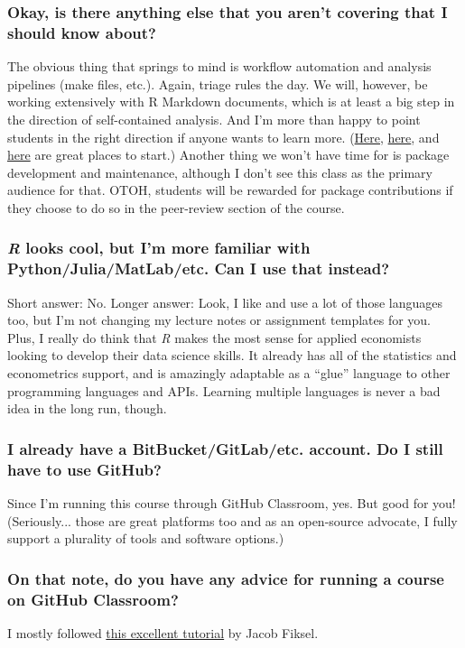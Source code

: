 \documentclass[12]{article}
\begin{document}
\vspace{-0.25cm}
\subsubsection*{Okay, is there anything else that you aren't covering that I should know about?}
The obvious thing that springs to mind is workflow automation and analysis pipelines (make files, etc.). Again, triage rules the day. We will, however, be working extensively with R Markdown documents, which is at least a big step in the direction of self-contained analysis. And I'm more than happy to point students in the right direction if anyone wants to learn more. (\href{http://stat545.com/Classroom/notes/cm109.nb.html}{Here}, \href{https://ropenscilabs.github.io/drake-manual/index.html}{here}, and \href{https://web.stanford.edu/~gentzkow/research/CodeAndData.pdf}{here} are great places to start.) Another thing we won't have time for is package development and maintenance, although I don't see this class as the primary audience for that. OTOH, students will be rewarded for package contributions if they choose to do so in the peer-review section of the course. 

\vspace{-0.25cm}
\subsubsection*{\textit{R} looks cool, but I'm more familiar with Python/Julia/MatLab/etc. Can I use that instead?}
Short answer: No. Longer answer: Look, I like and use a lot of those languages too, but I'm not changing my lecture notes or assignment templates for you. Plus, I really do think that \textit{R} makes the most sense for applied economists looking to develop their data science skills. It already has all of the statistics and econometrics support, and is amazingly adaptable as a ``glue'' language to other programming languages and APIs. Learning multiple languages is never a bad idea in the long run, though.

\vspace{-0.25cm}
\subsubsection*{I already have a BitBucket/GitLab/etc. account. Do I still have to use GitHub?}
Since I'm running this course through GitHub Classroom, yes. But good for you! (Seriously... those are great platforms too and as an open-source advocate, I fully support a plurality of tools and software options.)

\vspace{-0.25cm}
\subsubsection*{On that note, do you have any advice for running a course on GitHub Classroom?}
I mostly followed \href{https://github.com/jfiksel/github-classroom-for-teachers}{this excellent tutorial} by Jacob Fiksel.
\end{document}
